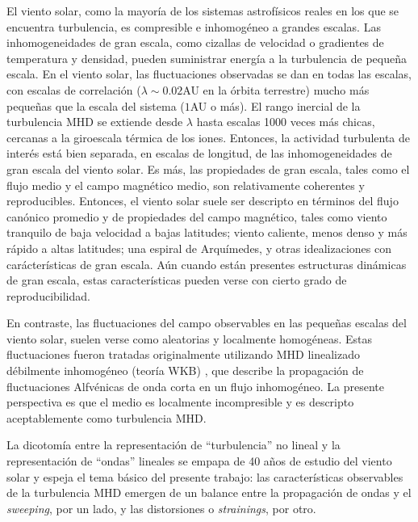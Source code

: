 El viento solar, como la mayoría de los sistemas astrofísicos reales
en los que se encuentra turbulencia, es compresible e inhomogéneo a
grandes escalas. Las inhomogeneidades de gran escala, como cizallas de
velocidad o gradientes de temperatura y densidad, pueden suministrar
energía a la turbulencia de pequeña escala. En el viento solar, las
fluctuaciones observadas se dan en todas las escalas, con escalas de
correlación ($\lambda \sim 0.02$AU en la órbita terrestre) mucho más
pequeñas que la escala del sistema ($1$AU o más). El rango inercial de
la turbulencia MHD se extiende desde $\lambda$ hasta escalas 1000
veces más chicas, cercanas a la giroescala térmica de los
iones. Entonces, la actividad turbulenta de interés está bien
separada, en escalas de longitud, de las inhomogeneidades de gran
escala del viento solar. Es más, las propiedades de gran escala, tales
como el flujo medio y el campo magnético medio, son relativamente
coherentes y reproducibles. Entonces, el viento solar suele ser
descripto en términos del flujo canónico promedio y de propiedades del
campo magnético, tales como viento tranquilo de baja velocidad a bajas
latitudes; viento caliente, menos denso y más rápido a altas
latitudes; una espiral de Arquímedes, y otras idealizaciones con
carácterísticas de gran escala. Aún cuando están presentes estructuras
dinámicas de gran escala, estas características pueden verse con
cierto grado de reproducibilidad.

En contraste, las fluctuaciones del campo observables en las pequeñas
escalas del viento solar, suelen verse como aleatorias y localmente
homogéneas. Estas fluctuaciones fueron tratadas originalmente
utilizando MHD linealizado débilmente inhomogéneo (teoría WKB)
\cite{parker_dynamical_1965, hollweg_alfven_1973,
  hollweg_transverse_1974, hollweg_transition_1986,
  jacques_momentum_1977, matthaeus_transport_1994}, que describe la
propagación de fluctuaciones Alfv\'enicas de onda corta en un flujo
inhomogéneo. La presente perspectiva es que el medio es localmente
incompresible \cite{matthaeus_evidence_1990} y es descripto
aceptablemente como turbulencia MHD.

La dicotomía entre la representación de ``turbulencia'' no lineal y la
representación de ``ondas'' lineales se empapa de 40 años de estudio
del viento solar y espeja el tema básico del presente trabajo: las
características observables de la turbulencia MHD emergen de un
balance entre la propagación de ondas y el \textit{sweeping}, por un
lado, y las distorsiones o \textit{strainings}, por otro.


